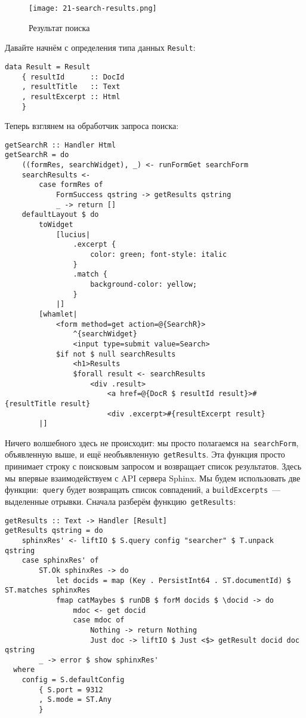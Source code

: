 \begin{figure}[hbt]
    \begin{center}
        \texttt{[image: 21-search-results.png]}
        \caption{Результат поиска}\label{Fig:search_results}
    \end{center}
\end{figure}

Давайте начнём с определения типа данных \lstinline'Result':
\begin{lstlisting}
data Result = Result
    { resultId      :: DocId
    , resultTitle   :: Text
    , resultExcerpt :: Html
    }
\end{lstlisting}

Теперь взглянем на обработчик запроса поиска: %
\begin{lstlisting}
getSearchR :: Handler Html
getSearchR = do
    ((formRes, searchWidget), _) <- runFormGet searchForm
    searchResults <-
        case formRes of
            FormSuccess qstring -> getResults qstring
            _ -> return []
    defaultLayout $ do
        toWidget
            [lucius|
                .excerpt {
                    color: green; font-style: italic
                }
                .match {
                    background-color: yellow;
                }
            |]
        [whamlet|
            <form method=get action=@{SearchR}>
                ^{searchWidget}
                <input type=submit value=Search>
            $if not $ null searchResults
                <h1>Results
                $forall result <- searchResults
                    <div .result>
                        <a href=@{DocR $ resultId result}>#{resultTitle result}
                        <div .excerpt>#{resultExcerpt result}
        |]
\end{lstlisting}%

Ничего волшебного здесь не происходит: мы просто полагаемся на~\lstinline'searchForm', объявленную выше, и ещё необъявленную~\lstinline'getResults'. Эта функция просто принимает строку с поисковым запросом и возвращает список результатов. Здесь мы впервые взаимодействуем с API сервера Sphinx. Мы будем использовать две функции:~\lstinline'query' будет возвращать список совпадений, а \lstinline'buildExcerpts'~--- выделенные отрывки. Сначала разберём функцию~\lstinline!getResults!:
\begin{lstlisting}
getResults :: Text -> Handler [Result]
getResults qstring = do
    sphinxRes' <- liftIO $ S.query config "searcher" $ T.unpack qstring
    case sphinxRes' of
        ST.Ok sphinxRes -> do
            let docids = map (Key . PersistInt64 . ST.documentId) $ ST.matches sphinxRes
            fmap catMaybes $ runDB $ forM docids $ \docid -> do
                mdoc <- get docid
                case mdoc of
                    Nothing -> return Nothing
                    Just doc -> liftIO $ Just <$> getResult docid doc qstring
        _ -> error $ show sphinxRes'
  where
    config = S.defaultConfig
        { S.port = 9312
        , S.mode = ST.Any
        }
\end{lstlisting}%

